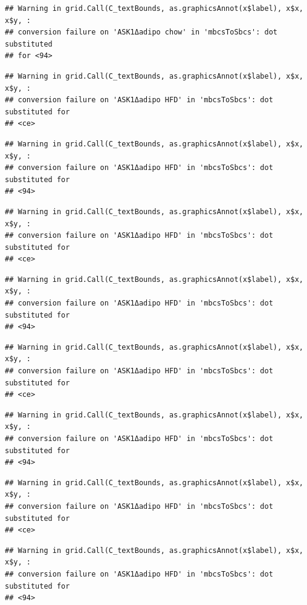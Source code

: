 \documentclass[]{book}
\begin{document}
\begin{verbatim}
## Warning in grid.Call(C_textBounds, as.graphicsAnnot(x$label), x$x, x$y, :
## conversion failure on 'ASK1Δadipo chow' in 'mbcsToSbcs': dot substituted
## for <94>
\end{verbatim}

\begin{verbatim}
## Warning in grid.Call(C_textBounds, as.graphicsAnnot(x$label), x$x, x$y, :
## conversion failure on 'ASK1Δadipo HFD' in 'mbcsToSbcs': dot substituted for
## <ce>
\end{verbatim}

\begin{verbatim}
## Warning in grid.Call(C_textBounds, as.graphicsAnnot(x$label), x$x, x$y, :
## conversion failure on 'ASK1Δadipo HFD' in 'mbcsToSbcs': dot substituted for
## <94>
\end{verbatim}

\begin{verbatim}
## Warning in grid.Call(C_textBounds, as.graphicsAnnot(x$label), x$x, x$y, :
## conversion failure on 'ASK1Δadipo HFD' in 'mbcsToSbcs': dot substituted for
## <ce>
\end{verbatim}

\begin{verbatim}
## Warning in grid.Call(C_textBounds, as.graphicsAnnot(x$label), x$x, x$y, :
## conversion failure on 'ASK1Δadipo HFD' in 'mbcsToSbcs': dot substituted for
## <94>
\end{verbatim}

\begin{verbatim}
## Warning in grid.Call(C_textBounds, as.graphicsAnnot(x$label), x$x, x$y, :
## conversion failure on 'ASK1Δadipo HFD' in 'mbcsToSbcs': dot substituted for
## <ce>
\end{verbatim}

\begin{verbatim}
## Warning in grid.Call(C_textBounds, as.graphicsAnnot(x$label), x$x, x$y, :
## conversion failure on 'ASK1Δadipo HFD' in 'mbcsToSbcs': dot substituted for
## <94>
\end{verbatim}

\begin{verbatim}
## Warning in grid.Call(C_textBounds, as.graphicsAnnot(x$label), x$x, x$y, :
## conversion failure on 'ASK1Δadipo HFD' in 'mbcsToSbcs': dot substituted for
## <ce>
\end{verbatim}

\begin{verbatim}
## Warning in grid.Call(C_textBounds, as.graphicsAnnot(x$label), x$x, x$y, :
## conversion failure on 'ASK1Δadipo HFD' in 'mbcsToSbcs': dot substituted for
## <94>
\end{verbatim}
\end{document}
